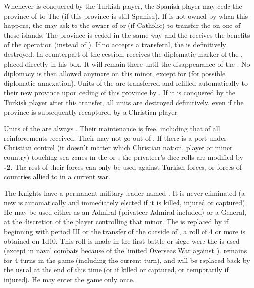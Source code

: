 \label{chSpecific:Knights:Transfer}
Whenever  is conquered by the Turkish player, the
Spanish player may cede the province of  to The
 (if this province is still Spanish).
\bparag If  is not owned by \SPA when this happens, the
\SDCF may ask to the owner of  or  (if
Catholic) to transfer the  on one of these islands. The
province is ceded in the same way and the \SDCF receives the benefits of
the operation (instead of \SPA). If no \MAJ accepts a transferal, the
 is definitively destroyed.
\bparag In counterpart of the cession, \SPA receives the diplomatic
marker of the , placed directly in his \VASSAL box. It
will remain there until the disappearance of the . No
diplomacy is then allowed anymore on this minor, except for \SPA (for
possible diplomatic annexation).
\bparag Units of the  are transferred and refilled
automatically to their new province upon ceding of this province by
\SPA.
\bparag If it is conquered by the Turkish player after this transfer,
all  units are destroyed definitively, even if the
province is subsequently recaptured by a Christian player.

\bparag
Units of the  are always . Their
maintenance is free, including that of all reinforcements received.
\bparag Their \corsaire may not go out of . If
there is a port under Christian control (it doesn't matter which
Christian nation, player or minor country) touching sea zones in the
 or , the privateer's dice rolls
are modified by {\bf -2}.
\bparag The rest of their forces can only be used against Turkish forces,
or forces of countries allied to \TUR in a current war.

\label{chSpecific:Grand Master}
The Knights have a permanent military leader named . It is never eliminated (a new  is
automatically and immediately elected if it is killed, injured or
captured).  He may be used either as an Admiral (privateer Admiral
included) or a General, at the discretion of the player controlling that
minor.
\bparag[La Valette]\label{chSpecific:La Valette}
The  is replaced by  if,
beginning with period III or the transfer of the 
outside of , a roll of 4 or more is obtained on
1d10. This roll is made in the first battle or siege were the
 is used (except in naval combats because of the
limited Overseas War against \TUR).  remains for 4
turns in the game (including the current turn), and will be replaced
back by the usual  at the end of this time (or if
killed or captured, or temporarily if injured). He may enter the game
only once.

